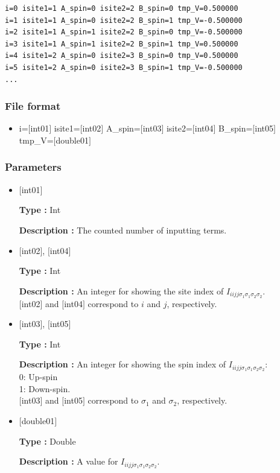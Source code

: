 \begin{minipage}{12.5cm}
\begin{screen}
\begin{verbatim}
i=0 isite1=1 A_spin=0 isite2=2 B_spin=0 tmp_V=0.500000 
i=1 isite1=1 A_spin=0 isite2=2 B_spin=1 tmp_V=-0.500000 
i=2 isite1=1 A_spin=1 isite2=2 B_spin=0 tmp_V=-0.500000 
i=3 isite1=1 A_spin=1 isite2=2 B_spin=1 tmp_V=0.500000 
i=4 isite1=2 A_spin=0 isite2=3 B_spin=0 tmp_V=0.500000 
i=5 isite1=2 A_spin=0 isite2=3 B_spin=1 tmp_V=-0.500000 
...
\end{verbatim}
\end{screen}
\end{minipage}

\subsubsection{File format}
 \begin{itemize}
   \item  i=$[$int01$]$ isite1=$[$int02$]$  A\_spin=$[$int03$]$ isite2=$[$int04$]$  B\_spin=$[$int05$]$ tmp\_V=$[$double01$]$ 
 \end{itemize}
 
\subsubsection{Parameters}
 \begin{itemize}

    \item  $[$int01$]$ 
   
    {\bf Type :} Int

   {\bf Description :} The counted number of inputting terms.
   
   \item  $[$int02$]$, $[$int04$]$
   
    {\bf Type :} Int

    {\bf Description :}   An integer for showing the site index of  $I_{iijj\sigma_1\sigma_1\sigma_2\sigma_2}$. \\
    $[$int02$]$ and $[$int04$]$ correspond to $i$ and $j$, respectively.
 
   \item  $[$int03$]$, $[$int05$]$  
   
    {\bf Type :} Int

   {\bf Description :}  An integer for showing the spin index of $I_{iijj\sigma_1\sigma_1\sigma_2\sigma_2}$:\\
   0: Up-spin\\
   1: Down-spin.\\
   $[$int03$]$ and $[$int05$]$ correspond to  $\sigma_1$ and $\sigma_2$, respectively.\\
 
   \item  $[$double01$]$ 
   
    {\bf Type :} Double

   {\bf Description :} A value for $I_{iijj\sigma_1\sigma_1\sigma_2\sigma_2}$.
  
\end{itemize}

